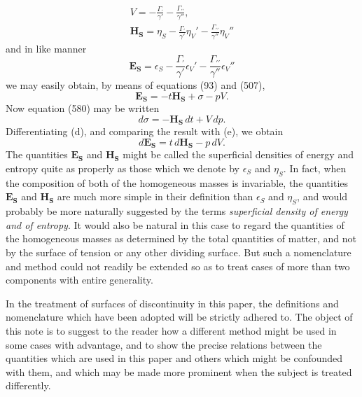 \documentclass[12pt]{memoir}
\begin{document}
{{\begin{gather}
V=-\frac{\Gamma_{\prime}}{\gamma'}-\frac{\Gamma_{\prime \prime}}{\gamma''},   \tag{a}\\
\mathbf{H}_\mathbf{S}=\eta_S-\frac{\Gamma_{\prime}}{\gamma'}\eta_{V}' -\frac{\Gamma_{\prime \prime}}{\gamma''}\eta_{V}'' \tag{b}\end{gather}
and in like manner
\begin{equation}
\mathbf{E}_\mathbf{S}=\epsilon_S-\frac{\Gamma_{\prime}}{\gamma'}\epsilon_{V}' -\frac{\Gamma_{\prime \prime}}{\gamma''}\epsilon_{V}'' \tag{c} \end{equation}
we may easily obtain, by means of equations (93) and (507),
\begin{equation} \mathbf{E}_\mathbf{S}=-t\mathbf{H}_\mathbf{S}+ \sigma -pV. \tag{d} \end{equation}
Now equation (580) may be written
\begin{equation} d\sigma = -\mathbf{H}_\mathbf{S} \, dt + V \, dp. \tag{e} \end{equation}
Differentiating (d), and comparing the result with (e), we obtain
\begin{equation}
d\mathbf{E}_\mathbf{S}=t\,d\mathbf{H}_\mathbf{S}-p \, dV. \tag{f} \end{equation}
The quantities $\mathbf{E}_\mathbf{S}$ and $\mathbf{H}_\mathbf{S}$ might be called the superficial densities of energy and entropy quite as properly as those which we denote by $\epsilon_S$ and $\eta_S$. In fact, when the composition of both of the homogeneous masses is invariable, the quantities $\mathbf{E}_\mathbf{S}$ and $\mathbf{H}_\mathbf{S}$ are much more simple in their definition than $\epsilon_S$ and $\eta_S$, and would probably be more naturally suggested by the terms \textit{superficial density of energy and of entropy}. It would also be natural in this case to regard the quantities of the homogeneous masses as determined by the total quantities of matter, and not by the surface of tension or any other dividing surface. But such a nomenclature and method could not readily be extended so as to treat cases of more than two components with entire generality. \par
In the treatment of surfaces of discontinuity in this paper, the definitions and nomenclature which have been adopted will be strictly adhered to. The object of this note is to suggest to the reader how a different method might be used in some cases with advantage, and to show the precise relations between the quantities which are used in this paper and others which might be confounded with them, and which may be made more prominent when the subject is treated differently.}

}
\end{document}
